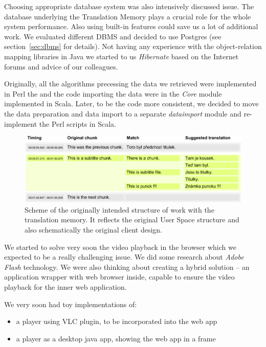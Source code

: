 Choosing appropriate database system was also intensively discussed issue. The database underlying the Translation Memory plays a crucial role for the whole system performance. Also using built-in features could save us a lot of additional work.  We evaluated different DBMS and decided to use Postgres (see section~\ref{sec:dbms} for details). Not having any experience with the object-relation mapping libraries in Java we started to us {\it Hibernate} based on the Internet forums and advice of our colleagues.

Originally, all the algorithms precessing the data we retrieved were implemented in Perl the and the code importing the data were in the \emph{Core} module implemented in Scala. Later, to be the code more consistent, we decided to move the data preparation and data import to a separate \emph{dataimport} module and re-implement the Perl scripts in Scala.

\begin{figure}[h]
\begin{center}
\includegraphics{./figures/original_strucutre.pdf}
\end{center}

\caption{Scheme of the originally intended structure of work with the translation memory. It reflects the original User Space structure and also schematically the original client design.}\label{fig:original_scheme}

\end{figure}

We started to solve very soon the video playback in the browser which we expected to be a really challenging issue. We did some research about \emph{Adobe Flash} technology. We were also thinking about creating a hybrid solution -- an application wrapper with web browser inside, capable to ensure the video playback for the inner web application.

We very soon had toy implementations of:

\begin{itemize}
\item a player using VLC plugin, to be incorporated into the web app

\item a player as a desktop java app, showing the web app in a frame
\end{itemize}

